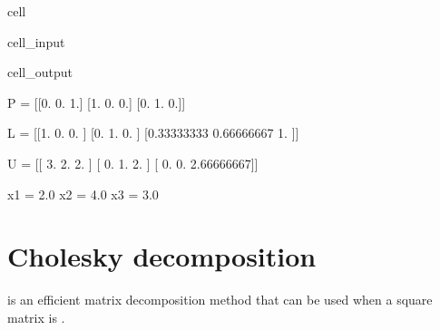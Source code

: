 \documentclass[letterpaper,10pt,english]{jupyterBook}
\begin{document}
\begin{sphinxuseclass}{cell}
\begin{sphinxVerbatimInput}
\begin{sphinxuseclass}{cell_input}
\begin{sphinxVerbatim}[commandchars=\\\{\}]
    
   

   
    \PYG{p}{[}\PYG{p}{]}
\end{sphinxVerbatim}

\end{sphinxuseclass}\end{sphinxVerbatimInput}
\begin{sphinxVerbatimOutput}

\begin{sphinxuseclass}{cell_output}
\begin{sphinxVerbatim}[commandchars=\\\{\}]
P = 
[[0. 0. 1.]
 [1. 0. 0.]
 [0. 1. 0.]]

L = 
[[1.         0.         0.        ]
 [0.         1.         0.        ]
 [0.33333333 0.66666667 1.        ]]

U = 
[[ 3.         \PYGZhy{}2.          2.        ]
 [ 0.          1.         \PYGZhy{}2.        ]
 [ 0.          0.          2.66666667]]

x1 = 2.0
x2 = 4.0
x3 = \PYGZhy{}3.0
\end{sphinxVerbatim}

\end{sphinxuseclass}\end{sphinxVerbatimOutput}

\end{sphinxuseclass}
\sphinxstepscope


\section{Cholesky decomposition}
\label{\detokenize{6_Direct_methods/6.3_Cholesky_decomposition:cholesky-decomposition}}\label{\detokenize{6_Direct_methods/6.3_Cholesky_decomposition:cholesky-section}}\label{\detokenize{6_Direct_methods/6.3_Cholesky_decomposition::doc}}
\sphinxAtStartPar
{} is an efficient matrix decomposition method that can be used when a square matrix is .
\end{document}
